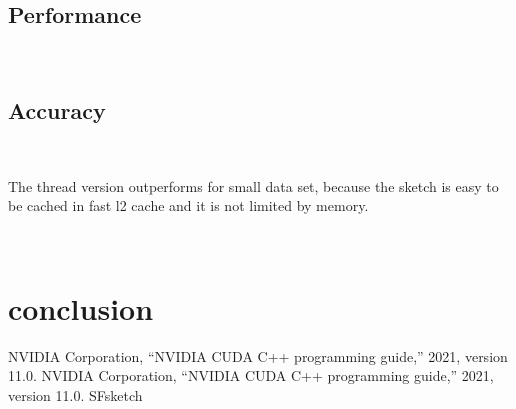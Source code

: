 \documentclass[conference]{IEEEtran}
\begin{document}

\subsection{Performance}



~




\subsection{Accuracy}





~

The thread version outperforms for small data set, because the sketch is easy to be cached in fast l2 cache and it is not limited by memory.


~

\section{conclusion}

\begin{thebibliography}{00}
 NVIDIA Corporation, “NVIDIA CUDA C++ programming guide,” 2021, version 11.0.
 NVIDIA Corporation, “NVIDIA CUDA C++ programming guide,” 2021, version 11.0.
 SFsketch
\end{thebibliography}
\end{document}
